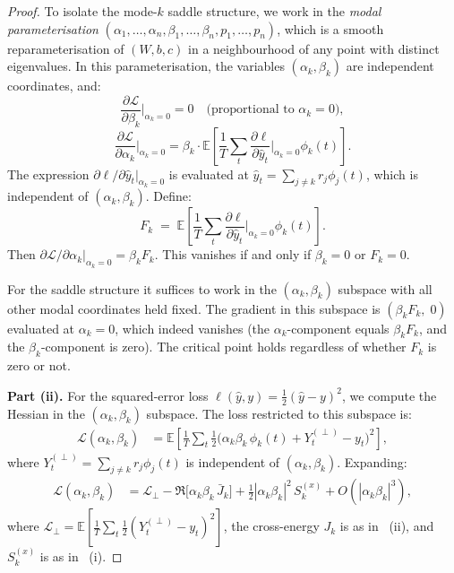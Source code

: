 \documentclass[11pt,a4paper]{article}
\theoremstyle{definition}
\newcommand{\E}{\mathbb{E}}
\newcommand{\cL}{\mathcal{L}}
\begin{document}
\begin{proof}
To isolate the mode-$k$ saddle structure, we work in the
\emph{modal parameterisation} $(\alpha_1,\ldots,\alpha_n,
\beta_1,\ldots,\beta_n, p_1,\ldots,p_n)$, which is a smooth
reparameterisation of $(W,b,c)$ in a neighbourhood of any point
with distinct eigenvalues. In this parameterisation, the variables
$(\alpha_k, \beta_k)$ are independent coordinates, and:
\[
  \frac{\partial\cL}{\partial\beta_k}\bigg|_{\alpha_k=0} = 0
  \quad \text{(proportional to } \alpha_k = 0\text{)},
\]
\[
  \frac{\partial\cL}{\partial\alpha_k}\bigg|_{\alpha_k=0}
  = \beta_k \cdot \E\!\left[\frac{1}{T}\sum_t
    \frac{\partial\ell}{\partial\hat{y}_t}
    \bigg|_{\alpha_k=0}\phi_k(t)\right].
\]
The expression $\partial\ell/\partial\hat{y}_t|_{\alpha_k=0}$
is evaluated at $\hat{y}_t = \sum_{j\neq k}r_j\phi_j(t)$,
which is independent of $(\alpha_k, \beta_k)$. Define:
\begin{equation}\label{eq:Fk_def}
  F_k \;=\; \E\!\left[\frac{1}{T}\sum_t
    \frac{\partial\ell}{\partial\hat{y}_t}
    \bigg|_{\alpha_k=0}\phi_k(t)\right].
\end{equation}
Then $\partial\cL/\partial\alpha_k|_{\alpha_k=0} = \beta_k F_k$.
This vanishes if and only if $\beta_k = 0$ or $F_k = 0$.

For the saddle structure it suffices to work in the
$(\alpha_k, \beta_k)$ subspace with all other modal coordinates
held fixed. The gradient in this subspace is
$({\beta_k F_k},\; 0)$ evaluated at $\alpha_k = 0$, which indeed
vanishes (the $\alpha_k$-component equals $\beta_k F_k$, and
the $\beta_k$-component is zero). The critical point holds
regardless of whether $F_k$ is zero or not.

\textbf{Part (ii).}
For the squared-error loss
$\ell(\hat{y},y) = \tfrac{1}{2}(\hat{y}-y)^2$, we compute the
Hessian in the $(\alpha_k, \beta_k)$ subspace. The loss
restricted to this subspace is:
\begin{align}
  \cL(\alpha_k, \beta_k)
  &= \E\!\left[\frac{1}{T}\sum_t \frac{1}{2}
    \bigl(\alpha_k\beta_k\,\phi_k(t) + Y_t^{(\perp)} - y_t
    \bigr)^2\right], \label{eq:loss_restricted}
\end{align}
where $Y_t^{(\perp)} = \sum_{j\neq k}r_j\phi_j(t)$ is
independent of $(\alpha_k, \beta_k)$. Expanding:
\begin{align}
  \cL(\alpha_k,\beta_k)
  &= \cL_{\perp}
  - \Re\!\bigl[\alpha_k\beta_k\,\bar{J}_k\bigr]
  + \tfrac{1}{2}|\alpha_k\beta_k|^2\, S_k^{(x)}
  + O(|\alpha_k\beta_k|^3),
  \label{eq:loss_expanded}
\end{align}
where $\cL_\perp = \E[\frac{1}{T}\sum_t \frac{1}{2}
(Y_t^{(\perp)}-y_t)^2]$, the cross-energy
$J_k$ is as in ~(ii), and
$S_k^{(x)}$ is as in ~(i).


\end{proof}
\end{document}
